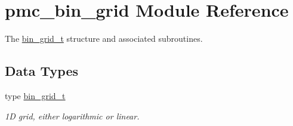 \hypertarget{namespacepmc__bin__grid}{}\section{pmc\+\_\+bin\+\_\+grid Module Reference}
\label{namespacepmc__bin__grid}


The \mbox{\hyperlink{structpmc__bin__grid_1_1bin__grid__t}{bin\+\_\+grid\+\_\+t}} structure and associated subroutines.  


\subsection*{Data Types}
\begin{DoxyCompactItemize}
\item 
type \mbox{\hyperlink{structpmc__bin__grid_1_1bin__grid__t}{bin\+\_\+grid\+\_\+t}}
\begin{DoxyCompactList}\small\item\em 1D grid, either logarithmic or linear. \end{DoxyCompactList}\end{DoxyCompactItemize}
